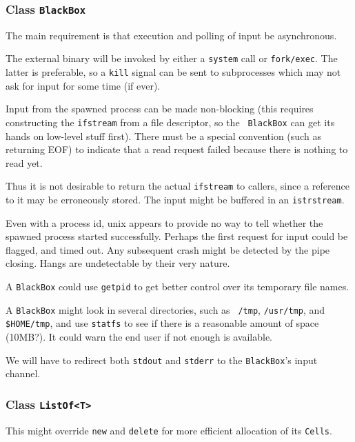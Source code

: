 \subsubsection{Class {\tt BlackBox}}

The main requirement is that execution and polling of input be
asynchronous.

The external binary will be invoked by either a {\tt system} call or
{\tt fork/exec}. The latter is preferable, so a {\tt kill} signal can
be sent to subprocesses which may not ask for input for some time (if
ever).

Input from the spawned process can be made non-blocking (this requires
constructing the {\tt ifstream} from a file descriptor, so the {\tt
BlackBox} can get its hands on low-level stuff first).  There must be
a special convention (such as returning EOF) to indicate that a read
request failed because there is nothing to read yet.

Thus it is not desirable to return the actual {\tt ifstream} to
callers, since a reference to it may be erroneously stored. The input
might be buffered in an {\tt istrstream}.

Even with a process id, unix appears to provide no way to tell whether
the spawned process started successfully. Perhaps the first request
for input could be flagged, and timed out. Any subsequent crash might
be detected by the pipe closing. Hangs are undetectable by their very
nature.

A {\tt BlackBox} could use {\tt getpid} to get better control over its
temporary file names.

A {\tt BlackBox} might look in several directories, such as {\tt
/tmp}, {\tt /usr/tmp}, and {\tt \$HOME/tmp}, and use {\tt statfs} to see if
there is a reasonable amount of space (10MB?).  It could warn the end
user if not enough is available.

We will have to redirect both {\tt stdout} and {\tt stderr} to the
{\tt BlackBox}'s input channel.


\subsubsection{Class {\tt ListOf<T>}}

This might override {\tt new} and {\tt delete} for more efficient
allocation of its {\tt Cells}.

